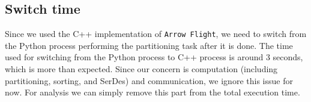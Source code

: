 \documentclass{article}
\begin{document}
\begin{appendices}
\subsection{Switch time}
Since we used the C++ implementation of \texttt{Arrow Flight}, we need to switch from the Python process performing the partitioning task
after it is done.
The time used for switching from the Python process to C++ process is around 3 seconds, which is more than expected.
Since our concern is computation (including partitioning, sorting, and SerDes) and communication, we ignore this issue for now.
For analysis we can simply remove this part from the total execution time.

\end{appendices}
\end{document}
